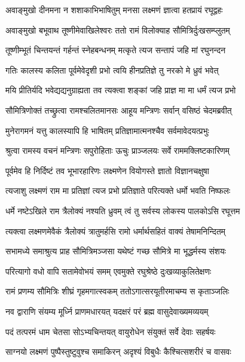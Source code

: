 \twolineshloka
{अवाङ्मुखो दीनमना न शशाकाभिभाषितुम्}
{मनसा लक्ष्मणं ज्ञात्वा हतप्रायं रघूद्वहः} %

\twolineshloka
{अवाङ्मुखो बभूवाथ तूष्णीमेवाखिलेश्वरः}
{ततो रामं विलोक्याह सौमित्रिर्दुःखसम्प्लुतम्} %

\twolineshloka
{तूष्णीम्भूतं चिन्तयन्तं गर्हन्तं स्नेहबन्धनम्}
{मत्कृते त्यज सन्तापं जहि मां रघुनन्दन} %

\twolineshloka
{गतिः कालस्य कलिता पूर्वमेवेदृशी प्रभो}
{त्वयि हीनप्रतिज्ञे तु नरको मे ध्रुवं भवेत्} %

\twolineshloka
{मयि प्रीतिर्यदि भवेद्यद्यनुग्राह्यता तव}
{त्यक्त्वा शङ्कां जहि प्राज्ञ मा मा धर्मं त्यज प्रभो} %

\twolineshloka
{सौमित्रिणोक्तं तच्छ्रुत्वा रामश्चलितमानसः}
{आहूय मन्त्रिणः सर्वान् वसिष्ठं चेदमब्रवीत्} %

\twolineshloka
{मुनेरागमनं यत्तु कालस्यापि हि भाषितम्}
{प्रतिज्ञामात्मनश्चैव सर्वमावेदयत्प्रभुः} %

\twolineshloka
{श्रुत्वा रामस्य वचनं मन्त्रिणः सपुरोहिताः}
{ऊचुः प्राञ्जलयः सर्वे राममक्लिष्टकारिणम्} %

\twolineshloka
{पूर्वमेव हि निर्दिष्टं तव भूभारहारिणः}
{लक्ष्मणेन वियोगस्ते ज्ञातो विज्ञानचक्षुषा} %

\twolineshloka
{त्यजाशु लक्ष्मणं राम मा प्रतिज्ञां त्यज प्रभो}
{प्रतिज्ञाते परित्यक्ते धर्मो भवति निष्फलः} %

\twolineshloka
{धर्मे नष्टेऽखिले राम त्रैलोक्यं नश्यति ध्रुवम्}
{त्वं तु सर्वस्य लोकस्य पालकोऽसि रघूत्तम} %

\twolineshloka
{त्यक्त्वा लक्ष्मणमेवैकं त्रैलोक्यं त्रातुमर्हसि}
{रामो धर्मार्थसहितं वाक्यं तेषामनिन्दितम्} %

\twolineshloka
{सभामध्ये समाश्रुत्य प्राह सौमित्रिमञ्जसा}
{यथेष्टं गच्छ सौमित्रे मा भूद्धर्मस्य संशयः} %

\twolineshloka
{परित्यागो वधो वापि सतामेवोभयं समम्}
{एवमुक्ते रघुश्रेष्ठे दुःखव्याकुलितेक्षणः} %

\twolineshloka
{रामं प्रणम्य सौमित्रिः शीघ्रं गृहमगात्स्वकम्}
{ततोऽगात्सरयूतीरमाचम्य स कृताञ्जलिः} %

\twolineshloka
{नव द्वाराणि संयम्य मूर्ध्नि प्राणमधारयत्}
{यदक्षरं परं ब्रह्म वासुदेवाख्यमव्ययम्} %

\twolineshloka
{पदं तत्परमं धाम चेतसा सोऽभ्यचिन्तयत्}
{वायुरोधेन संयुक्तं सर्वे देवाः सहर्षयः} %

\twolineshloka
{साग्नयो लक्ष्मणं पुष्पैस्तुष्टुवुश्च समाकिरन्}
{अदृश्यं विबुधैः कैश्चित्सशरीरं च वासवः} %

